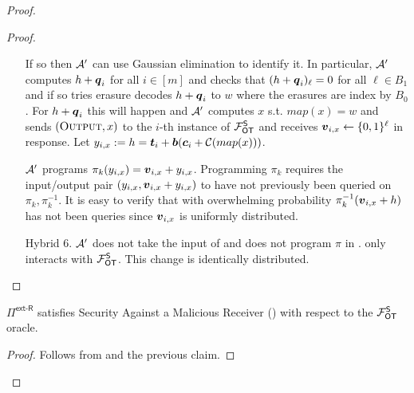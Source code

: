 \begin{proof}
\begin{proof}
\begin{enumerate}[leftmargin=1.8cm]
			
			If so then $\mathcal{A}'$ can use Gaussian elimination to identify it. In particular, $\mathcal{A}'$ computes $h+\boldsymbol{q}_i$ for all $i\in[m]$ and checks that $(h+\boldsymbol{q}_i)_\ell =0$ for all $\ell\in B_1$ and if so tries erasure decodes $h+\boldsymbol{q}_i$ to $w$ where the erasures are index by $B_0$. For $h+\boldsymbol{q}_i$ this will happen and $\mathcal{A}'$ computes $x$ s.t. $map(x)=w$ and sends $(\textsc{Output}, x)$ to the $i$-th instance of $\mathcal{F}_{\mathsf{OT}}^\mathsf{S}$ and receives $\boldsymbol{v}_{i,x}\gets\{0,1\}^\ell$ in response.  Let $y_{i,x}:=h=\boldsymbol{t}_i + \boldsymbol{b} (\boldsymbol{c}_i + \mathcal{C}(map(x)))$.
			
			$\mathcal{A}'$ programs $\pi_k(y_{i,x})=\boldsymbol{v}_{i,x}+y_{i,x}$. Programming $\pi_k$ requires the input/output pair $(y_{i,x},\boldsymbol{v}_{i,x}+y_{i,x})$ to have not previously been queried on $\pi_k,\pi_k^{-1}$.  It is easy to verify that with overwhelming probability $\pi_k^{-1}(\boldsymbol{v}_{i,x}+h)$ has not been queries since $\boldsymbol{v}_{i,x}$ is uniformly distributed. 
			
			
			
			\item[Hybrid 6.] $\mathcal{A}'$ does not take the input of \send and does not program $\pi$ in . \send only interacts with $\mathcal{F}_{\mathsf{OT}}^\mathsf{S}$. This change is identically distributed.
		\end{enumerate} 
	\end{proof}


	\begin{claim}\label{claim:ext-R-S-MalReceiver2}
		$\Pi^{\textsf{ext-R}}$ satisfies Security Against a Malicious Receiver () with respect to the $\mathcal{F}_{\mathsf{OT}}^\mathsf{S}$ oracle.
	\end{claim}
	\begin{proof}
		Follows from  and the previous claim.
	\end{proof}
\end{proof}



